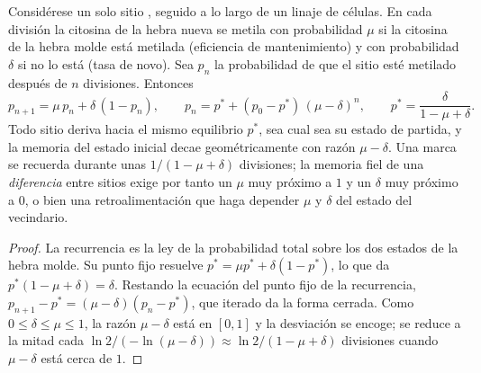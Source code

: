 \begin{theorem}\label{thm:b3:chromatin-epigenetics:maintenance}
Considérese un solo sitio , seguido a lo largo de un linaje de
células. En cada división la citosina de la hebra nueva se metila con
probabilidad $\mu$ si la citosina de la hebra molde está metilada
(eficiencia de mantenimiento) y con probabilidad $\delta$ si no lo está
(tasa de novo). Sea $p_{n}$ la probabilidad de que el sitio esté metilado
después de $n$ divisiones. Entonces
\[
p_{n+1} = \mu\, p_{n} + \delta\,(1 - p_{n}),
\qquad
p_{n} = p^{*} + (p_{0} - p^{*})\,(\mu - \delta)^{n},
\qquad
p^{*} = \frac{\delta}{1 - \mu + \delta}.
\]
Todo sitio deriva hacia el mismo equilibrio $p^{*}$, sea cual sea su
estado de partida, y la memoria del estado inicial decae
geométricamente con razón $\mu - \delta$. Una marca se recuerda durante
unas $1/(1 - \mu + \delta)$ divisiones; la memoria fiel de una
\emph{diferencia} entre sitios exige por tanto un $\mu$ muy próximo a $1$
y un $\delta$ muy próximo a $0$, o bien una retroalimentación que haga
depender $\mu$ y $\delta$ del estado del vecindario.
\end{theorem}
\begin{proof}
La recurrencia es la ley de la probabilidad total sobre los dos estados
de la hebra molde. Su punto fijo resuelve $p^{*} = \mu p^{*} + \delta(1 -
p^{*})$, lo que da $p^{*}(1 - \mu + \delta) = \delta$. Restando la
ecuación del punto fijo de la recurrencia, $p_{n+1} - p^{*} = (\mu -
\delta)(p_{n} - p^{*})$, que iterado da la forma cerrada. Como
$0 \le \delta \le \mu \le 1$, la razón $\mu - \delta$ está en $[0,1]$ y
la desviación se encoge; se reduce a la mitad cada $\ln 2 / (-\ln(\mu -
\delta)) \approx \ln 2/(1 - \mu + \delta)$ divisiones cuando $\mu -
\delta$ está cerca de $1$.
\end{proof}

